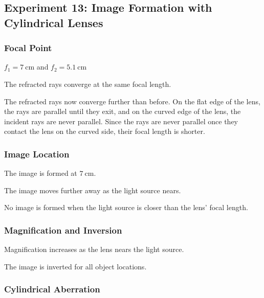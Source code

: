\documentclass[12pt]{article}
\begin{document}

\subsection{Experiment 13: Image Formation with Cylindrical Lenses}

\subsubsection{Focal Point}

\subsubsubsection{}

\(f_1 = \SI{7}{\centi\meter}\) and \(f_2 = \SI{5.1}{\centi\meter}\)

\subsubsubsection{}

The refracted rays converge at the same focal length.

\subsubsubsection{}

The refracted rays now converge further than before. On the flat edge of the
lens, the rays are parallel until they exit, and on the curved edge of the lens,
the incident rays are never parallel. Since the rays are never parallel once
they contact the lens on the curved side, their focal length is shorter.

\subsubsection{Image Location}

\subsubsubsection{}

The image is formed at \(\SI{7}{\centi\meter}\).

\subsubsubsection{}

The image moves further away as the light source nears.

\subsubsubsection{}

No image is formed when the light source is closer than the lens' focal length.

\subsubsection{Magnification and Inversion}

\subsubsubsection{}

Magnification increases as the lens nears the light source.

\subsubsubsection{}

The image is inverted for all object locations.

\subsubsection{Cylindrical Aberration}
\end{document}
